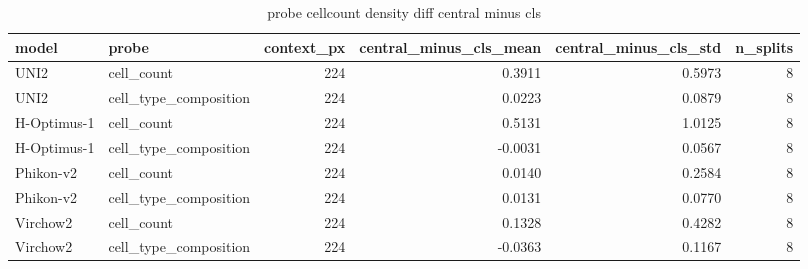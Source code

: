 \begin{table}
\caption{probe cellcount density diff central minus cls}
\label{tab:probe_cellcount_density_diff_central_minus_cls}
\begin{tabular}{llrrrr}
\toprule
model & probe & context_px & central_minus_cls_mean & central_minus_cls_std & n_splits \\
\midrule
UNI2 & cell_count & 224 & 0.3911 & 0.5973 & 8 \\
UNI2 & cell_type_composition & 224 & 0.0223 & 0.0879 & 8 \\
H-Optimus-1 & cell_count & 224 & 0.5131 & 1.0125 & 8 \\
H-Optimus-1 & cell_type_composition & 224 & -0.0031 & 0.0567 & 8 \\
Phikon-v2 & cell_count & 224 & 0.0140 & 0.2584 & 8 \\
Phikon-v2 & cell_type_composition & 224 & 0.0131 & 0.0770 & 8 \\
Virchow2 & cell_count & 224 & 0.1328 & 0.4282 & 8 \\
Virchow2 & cell_type_composition & 224 & -0.0363 & 0.1167 & 8 \\
\bottomrule
\end{tabular}
\end{table}
